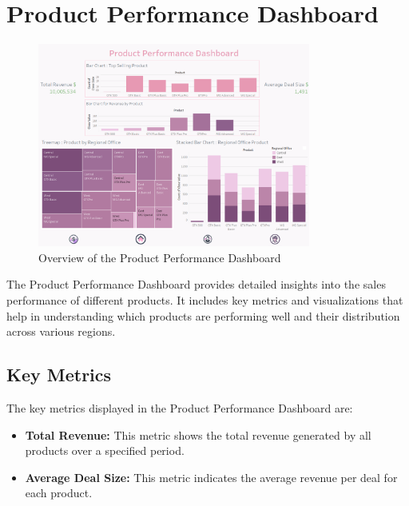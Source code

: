 \documentclass{article}
\begin{document}
\clearpage
\section{Product Performance Dashboard}
\begin{figure}[h!]
    \centering
    \includegraphics[width=0.8\textwidth]{resources/swappy-20240527_160325.png}
    \caption{Overview of the Product Performance Dashboard}
    \label{fig:product_performance_dashboard_overview}
\end{figure}
The Product Performance Dashboard provides detailed insights into the sales performance of different products. It includes key metrics and visualizations that help in understanding which products are performing well and their distribution across various regions.

\subsection{Key Metrics}
The key metrics displayed in the Product Performance Dashboard are:
\begin{itemize}
    \item \textbf{Total Revenue:} This metric shows the total revenue generated by all products over a specified period.
    \item \textbf{Average Deal Size:} This metric indicates the average revenue per deal for each product.
\end{itemize}
\end{document}

